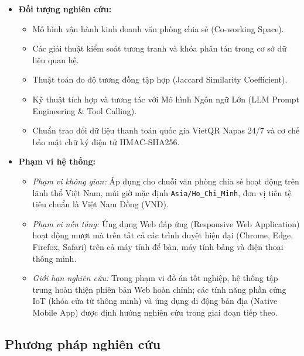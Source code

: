 \begin{itemize}
    \item \textbf{Đối tượng nghiên cứu:}
    \begin{itemize}
        \item Mô hình vận hành kinh doanh văn phòng chia sẻ (Co-working Space).
        \item Các giải thuật kiểm soát tương tranh và khóa phân tán trong cơ sở dữ liệu quan hệ.
        \item Thuật toán đo độ tương đồng tập hợp (Jaccard Similarity Coefficient).
        \item Kỹ thuật tích hợp và tương tác với Mô hình Ngôn ngữ Lớn (LLM Prompt Engineering \& Tool Calling).
        \item Chuẩn trao đổi dữ liệu thanh toán quốc gia VietQR Napas 24/7 và cơ chế bảo mật chữ ký điện tử HMAC-SHA256.
    \end{itemize}
    \item \textbf{Phạm vi hệ thống:}
    \begin{itemize}
        \item \textit{Phạm vi không gian:} Áp dụng cho chuỗi văn phòng chia sẻ hoạt động trên lãnh thổ Việt Nam, múi giờ mặc định \texttt{Asia/Ho\_Chi\_Minh}, đơn vị tiền tệ tiêu chuẩn là Việt Nam Đồng (VNĐ).
        \item \textit{Phạm vi nền tảng:} Ứng dụng Web đáp ứng (Responsive Web Application) hoạt động mượt mà trên tất cả các trình duyệt hiện đại (Chrome, Edge, Firefox, Safari) trên cả máy tính để bàn, máy tính bảng và điện thoại thông minh.
        \item \textit{Giới hạn nghiên cứu:} Trong phạm vi đồ án tốt nghiệp, hệ thống tập trung hoàn thiện phiên bản Web hoàn chỉnh; các tính năng phần cứng IoT (khóa cửa từ thông minh) và ứng dụng di động bản địa (Native Mobile App) được định hướng nghiên cứu trong giai đoạn tiếp theo.
    \end{itemize}
\end{itemize}

\subsection{Phương pháp nghiên cứu}

